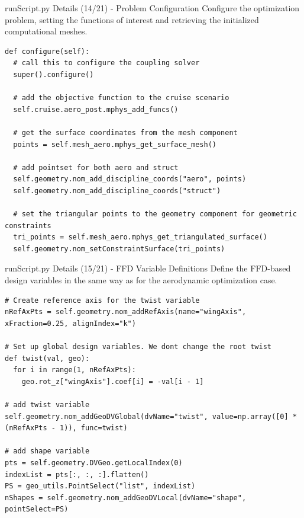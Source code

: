 \documentclass{bredelebeamer}
\begin{document}
\begin{frame}[fragile]{runScript.py Details (14/21) - \large Problem Configuration}
Configure the optimization problem, setting the functions of interest and retrieving the initialized computational meshes.

\scriptsize
\lstset{ language=bash }
\begin{lstlisting}
def configure(self):
  # call this to configure the coupling solver
  super().configure()

  # add the objective function to the cruise scenario
  self.cruise.aero_post.mphys_add_funcs()

  # get the surface coordinates from the mesh component
  points = self.mesh_aero.mphys_get_surface_mesh()

  # add pointset for both aero and struct
  self.geometry.nom_add_discipline_coords("aero", points)
  self.geometry.nom_add_discipline_coords("struct")

  # set the triangular points to the geometry component for geometric constraints
  tri_points = self.mesh_aero.mphys_get_triangulated_surface()
  self.geometry.nom_setConstraintSurface(tri_points)
\end{lstlisting}
\normalsize
\end{frame}

\begin{frame}[fragile]{runScript.py Details (15/21) - \large FFD Variable Definitions}
Define the FFD-based design variables in the same way as for the aerodynamic optimization case.
  \scriptsize
\lstset{ language=bash }
\begin{lstlisting}
# Create reference axis for the twist variable
nRefAxPts = self.geometry.nom_addRefAxis(name="wingAxis", xFraction=0.25, alignIndex="k")

# Set up global design variables. We dont change the root twist
def twist(val, geo):
  for i in range(1, nRefAxPts):
    geo.rot_z["wingAxis"].coef[i] = -val[i - 1]

# add twist variable
self.geometry.nom_addGeoDVGlobal(dvName="twist", value=np.array([0] * (nRefAxPts - 1)), func=twist)

# add shape variable
pts = self.geometry.DVGeo.getLocalIndex(0)
indexList = pts[:, :, :].flatten()
PS = geo_utils.PointSelect("list", indexList)
nShapes = self.geometry.nom_addGeoDVLocal(dvName="shape", pointSelect=PS)
\end{lstlisting}
\normalsize
\end{frame}
\end{document}
